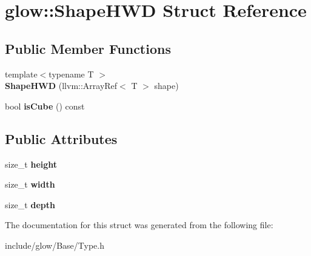 \hypertarget{structglow_1_1_shape_h_w_d}{}\section{glow\+:\+:Shape\+H\+WD Struct Reference}
\label{structglow_1_1_shape_h_w_d}
\subsection*{Public Member Functions}
\begin{DoxyCompactItemize}
\item 
\mbox{\label{structglow_1_1_shape_h_w_d_a155d089bd3cad98f73a948c1e6aef1de}} 
{\footnotesize template$<$typename T $>$ }\\{\bfseries Shape\+H\+WD} (llvm\+::\+Array\+Ref$<$ T $>$ shape)
\item 
\mbox{\label{structglow_1_1_shape_h_w_d_a38223c6accff18eb43e915a270cb55a5}} 
bool {\bfseries is\+Cube} () const
\end{DoxyCompactItemize}
\subsection*{Public Attributes}
\begin{DoxyCompactItemize}
\item 
\mbox{\label{structglow_1_1_shape_h_w_d_a86cd11d68836342b413b29f62228eafa}} 
size\+\_\+t {\bfseries height}
\item 
\mbox{\label{structglow_1_1_shape_h_w_d_a145adad5184a1f511842a20ff7a0844b}} 
size\+\_\+t {\bfseries width}
\item 
\mbox{\label{structglow_1_1_shape_h_w_d_a8367ebf1f8cab308083cc3330e93cd64}} 
size\+\_\+t {\bfseries depth}
\end{DoxyCompactItemize}


The documentation for this struct was generated from the following file\+:\begin{DoxyCompactItemize}
\item 
include/glow/\+Base/Type.\+h\end{DoxyCompactItemize}
